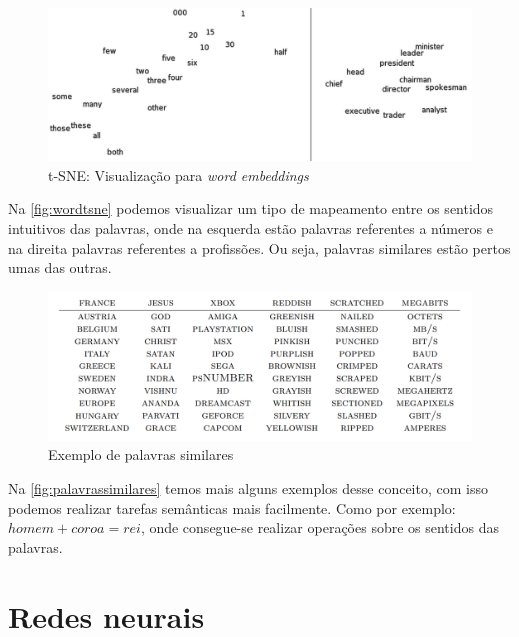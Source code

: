 \begin{figure}[htb]
  \caption{t-SNE: Visualização para \textit{word embeddings}}\label{fig:wordtsne}
  \begin{center}
      \includegraphics[scale=0.25]{img/Turian-WordTSNE}
  \end{center}
\end{figure}

Na \autoref{fig:wordtsne} podemos visualizar um tipo de mapeamento entre os sentidos intuitivos das palavras, onde na esquerda estão palavras referentes a números e na direita palavras referentes a profissões. Ou seja, palavras similares estão pertos umas das outras.

\begin{figure}[htb]
  \caption{Exemplo de palavras similares}\label{fig:palavrassimilares}
  \begin{center}
      \includegraphics[scale=0.35]{img/Colbert-WordTable2}
  \end{center}
\end{figure}

Na \autoref{fig:palavrassimilares} temos mais alguns exemplos desse conceito, com isso podemos realizar tarefas semânticas mais facilmente. Como por exemplo: $homem + coroa = rei$, onde consegue-se realizar operações sobre os sentidos das palavras.



\section{Redes neurais}\label{sec:redesneurais}

